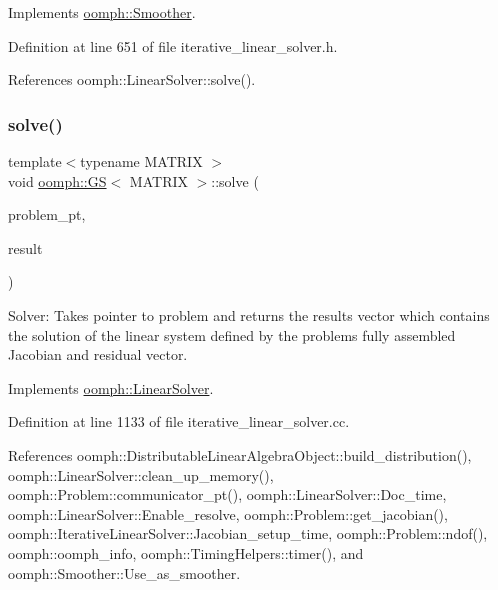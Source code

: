 Implements \hyperlink{classoomph_1_1Smoother_a94899c8d7bf84c068cda8d312d195bfe}{oomph\+::\+Smoother}.



Definition at line 651 of file iterative\+\_\+linear\+\_\+solver.\+h.



References oomph\+::\+Linear\+Solver\+::solve().

\mbox{\label{classoomph_1_1GS_ad7d1bfb3d25a194d2875e266e104dc9f}} 
\subsubsection{\texorpdfstring{solve()}{solve()}\hspace{0.1cm}{\footnotesize\ttfamily [1/3]}}
{\footnotesize\ttfamily template$<$typename M\+A\+T\+R\+IX $>$ \\
void \hyperlink{classoomph_1_1GS}{oomph\+::\+GS}$<$ M\+A\+T\+R\+IX $>$\+::solve (\begin{DoxyParamCaption}\item[{\hyperlink{classoomph_1_1Problem}{Problem} $\ast$const \&}]{problem\+\_\+pt,  }\item[{\hyperlink{classoomph_1_1DoubleVector}{Double\+Vector} \&}]{result }\end{DoxyParamCaption})\hspace{0.3cm}{\ttfamily [virtual]}}



Solver\+: Takes pointer to problem and returns the results vector which contains the solution of the linear system defined by the problem\textquotesingle{}s fully assembled Jacobian and residual vector. 



Implements \hyperlink{classoomph_1_1LinearSolver_a15ce22542b74ed1826ea485edacbeb6e}{oomph\+::\+Linear\+Solver}.



Definition at line 1133 of file iterative\+\_\+linear\+\_\+solver.\+cc.



References oomph\+::\+Distributable\+Linear\+Algebra\+Object\+::build\+\_\+distribution(), oomph\+::\+Linear\+Solver\+::clean\+\_\+up\+\_\+memory(), oomph\+::\+Problem\+::communicator\+\_\+pt(), oomph\+::\+Linear\+Solver\+::\+Doc\+\_\+time, oomph\+::\+Linear\+Solver\+::\+Enable\+\_\+resolve, oomph\+::\+Problem\+::get\+\_\+jacobian(), oomph\+::\+Iterative\+Linear\+Solver\+::\+Jacobian\+\_\+setup\+\_\+time, oomph\+::\+Problem\+::ndof(), oomph\+::oomph\+\_\+info, oomph\+::\+Timing\+Helpers\+::timer(), and oomph\+::\+Smoother\+::\+Use\+\_\+as\+\_\+smoother.

